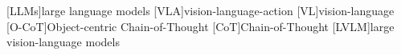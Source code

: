 \newcommand{\specialcell}[2][c]{%
\begin{tabular}[#1]{@{}c@{}}#2\end{tabular}}

\newcommand{\sota}{state-of-the-art\xspace}

\newcommand{\cmark}{\ding{51}}
\newcommand{\xmark}{\ding{55}}

\newcommand{\todo}[1]{{\color{red}#1}}
\newcommand{\TODO}[1]{\textbf{\color{red}[TODO: #1]}}



\def\emoji{\hbox{\texttt{[image: figs/leo.png]}}}

\newcommand{\agent}{\textsc{LEO}\xspace}

[LLMs]{large language models}
[VLA]{vision-language-action}
[VL]{vision-language}
[O-CoT]{Object-centric Chain-of-Thought}
[CoT]{Chain-of-Thought}
[LVLM]{large vision-language models}

